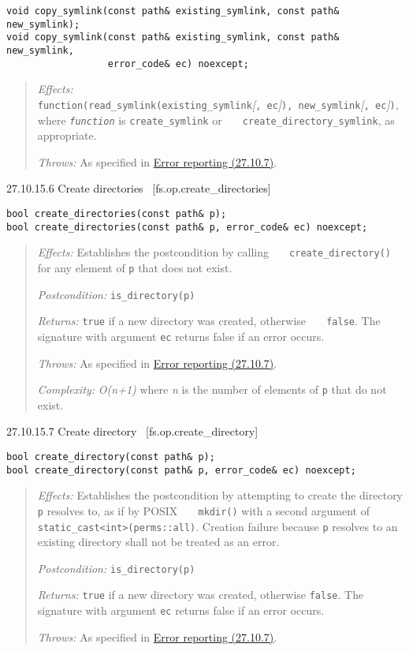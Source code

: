 \begin{verbatim}
void copy_symlink(const path& existing_symlink, const path& new_symlink);
void copy_symlink(const path& existing_symlink, const path& new_symlink,
                  error_code& ec) noexcept;
\end{verbatim}

\begin{quote}
\emph{Effects:}
\texttt{function(read\_symlink(existing\_symlink}\emph{{[}}\texttt{,\ ec}\emph{{]}}\texttt{),\ new\_symlink}\emph{{[}}\texttt{,\ ec}\emph{{]}}\texttt{)},
where \emph{\texttt{function}} is \texttt{create\_symlink} or
\texttt{\ \ \ create\_directory\_symlink}, as appropriate.

\emph{Throws:} As specified in \hyperref[Error-reporting]{Error
reporting (27.10.7)}.
\end{quote}

27.10.15.6 Create directories~ {[}fs.op.create\_directories{]}

\begin{verbatim}
bool create_directories(const path& p);
bool create_directories(const path& p, error_code& ec) noexcept;
\end{verbatim}

\begin{quote}
\emph{Effects:} Establishes the postcondition by calling
\texttt{\ \ \ create\_directory()} for any element of \texttt{p} that
does not exist.

\emph{Postcondition:} \texttt{is\_directory(p)}

\emph{Returns:} \texttt{true} if a new directory was created, otherwise
\texttt{\ \ \ false}. The signature with argument \texttt{ec} returns
false if an error occurs.

\emph{Throws:} As specified in \hyperref[Error-reporting]{Error
reporting (27.10.7)}.

\emph{Complexity:} \emph{O(n+1)} where \emph{n} is the number of
elements of \texttt{p} that do not exist.
\end{quote}

27.10.15.7 Create directory~ {[}fs.op.create\_directory{]}

\begin{verbatim}
bool create_directory(const path& p);
bool create_directory(const path& p, error_code& ec) noexcept;
\end{verbatim}

\begin{quote}
\emph{Effects:} Establishes the postcondition by attempting to create
the directory \texttt{p} resolves to, as if by POSIX
\texttt{\ \ \ mkdir()} with a second argument of
\texttt{static\_cast\textless{}int\textgreater{}(perms::all)}. Creation
failure because \texttt{p} resolves to an existing directory shall not
be treated as an error.

\emph{Postcondition:} \texttt{is\_directory(p)}

\emph{Returns:} \texttt{true} if a new directory was created, otherwise
\texttt{false}. The signature with argument \texttt{ec} returns false if
an error occurs.

\emph{Throws:} As specified in \hyperref[Error-reporting]{Error
reporting (27.10.7)}.
\end{quote}

